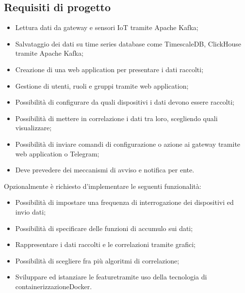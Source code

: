 \subsection{Requisiti di progetto}
\begin{itemize}
	\item Lettura dati da gateway e sensori IoT tramite Apache Kafka;
	\item Salvataggio dei dati su time series database come TimescaleDB, ClickHouse tramite Apache Kafka;
	\item Creazione di una web application per presentare i dati raccolti;
	\item Gestione di utenti, ruoli e gruppi tramite web application;
	\item Possibilità di configurare da quali dispositivi i dati devono essere raccolti;
	\item Possibilità di mettere in correlazione i dati tra loro, scegliendo quali visualizzare;
	\item Possibilità di inviare comandi di configurazione o azione ai gateway tramite web application o Telegram;
	\item Deve prevedere dei meccanismi di avviso e notifica per ente.
\end{itemize}
Opzionalmente è richiesto d'implementare le seguenti funzionalità:
\begin{itemize}
	\item Possibilità di impostare una frequenza di interrogazione dei dispositivi ed invio dati;
	\item Possibilità di specificare delle funzioni di accumulo sui dati;
	\item Rappresentare i dati raccolti e le correlazioni tramite grafici;
	\item Possibilità di scegliere fra più algoritmi di correlazione;
	\item Sviluppare ed istanziare le feature\glosp tramite uso della tecnologia di containerizzazione\glosp Docker.
\end{itemize}

